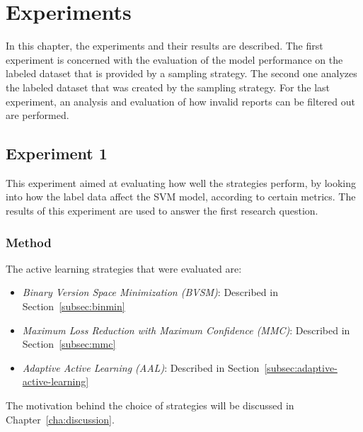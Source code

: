 \chapter{Experiments}
\label{cha:experiments}

In this chapter, the experiments and their results are described.
The first experiment is concerned with the evaluation of the model performance on the labeled dataset that is provided by a sampling strategy.
The second one analyzes the labeled dataset that was created by the sampling strategy.
For the last experiment, an analysis and evaluation of how invalid reports can be filtered out are performed.

\section{Experiment 1}
\label{sec:experiments-exp1}

This experiment aimed at evaluating how well the strategies perform, by looking into how the label data affect the SVM model, according to certain metrics.
The results of this experiment are used to answer the first research question.

\subsection{Method}
\label{sec:experiments-exp1-method}

The active learning strategies that were evaluated are:
\begin{itemize}
    \item \textit{Binary Version Space Minimization (BVSM)}: Described in Section~\ref{subsec:binmin}
    \item \textit{Maximum Loss Reduction with Maximum Confidence (MMC)}: Described in Section~\ref{subsec:mmc}
    \item \textit{Adaptive Active Learning (AAL)}: Described in Section~\ref{subsec:adaptive-active-learning}
\end{itemize}
The motivation behind the choice of strategies will be discussed in Chapter~\ref{cha:discussion}.

